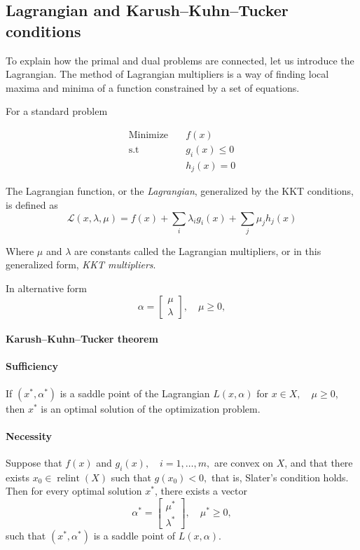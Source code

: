 \documentclass[12pt, openany]{article}
\begin{document}
\subsection{Lagrangian and Karush–Kuhn–Tucker conditions}

To explain how the primal and dual problems are connected, let us introduce the Lagrangian. The method of Lagrangian multipliers is a way of finding local maxima and minima of a function constrained by a set of equations.

For a standard problem

\[
\begin{aligned}
\text{Minimize} & \quad
f(x) \\[4pt]
\text{s.t} & \quad g_i(x)\le 0 \\[4pt]
&\quad  h_j(x)=0
\end{aligned}
\]

The Lagrangian function, or the \textit{Lagrangian}, generalized by the KKT conditions, is defined as
\[
\mathcal L(x,\lambda,\mu)=f(x)+\sum_i \lambda_i g_i(x)+\sum_j \mu_j h_j(x)
\]

Where \(\mu\) and \(\lambda\) are constants called the Lagrangian multipliers, or in this generalized form, \textit{KKT multipliers}.

In alternative form
\[ 
\alpha = \begin{bmatrix} \mu\\ \lambda\end{bmatrix}, \quad \mu \ge 0, 
\] 

\paragraph{Karush–Kuhn–Tucker theorem} 
\paragraph{Sufficiency} If \( (x^*, \alpha^*) \) is a saddle point of the Lagrangian \( L(x,\alpha)\) for \( x \in X, \quad \mu \ge 0 \), then \(x^*\) is an optimal solution of the optimization problem. 

\paragraph{Necessity} Suppose that \( f(x) \) and \( g_i(x), \quad i=1,\dots,m, \) are convex on \(X\), and that there exists \( x_0 \in \operatorname{relint}(X) \) such that \( g(x_0) < 0, \) that is, Slater's condition holds. Then for every optimal solution \(x^\ast\), there exists a vector 
\[ 
\alpha^\ast = \begin{bmatrix} \mu^\ast \\ \lambda^\ast \end{bmatrix}, \quad \mu^\ast \ge 0, 
\] 
such that \( (x^\ast,\alpha^\ast) \) is a saddle point of \( L(x,\alpha). \)
\end{document}

